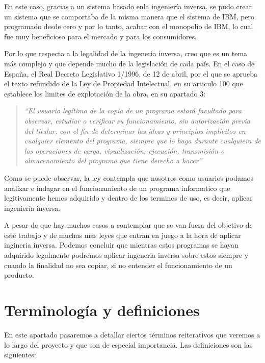 En este caso, gracias a un sistema basado enla ingeniería inversa, se pudo crear un sistema que se comportaba
de la misma manera que el sistema de IBM, pero programado desde cero y por lo tanto, acabar con el monopolio 
de IBM, lo cual fue muy beneficioso para el mercado y para los consumidores.

Por lo que respecta a la legalidad de la ingeneria inversa, creo que es un tema más complejo y que depende
mucho de la legislación de cada país. En el caso de España, el Real Decreto Legislativo 1/1996, de 12 de abril,
por el que se aprueba el texto refundido de la Ley de Propiedad Intelectual, en su articulo 100 que establece
los limites de explotación de la obra, en su apartado 3\cite{LeyPropiedadIntelectual}: 

\begin{quote}
    \textit{``El usuario legítimo de la copia de un programa estará facultado para observar, estudiar o 
    verificar su funcionamiento, sin autorización previa del titular, con el fin de determinar las ideas
    y principios implícitos en cualquier elemento del programa, siempre que lo haga durante cualquiera de
    las operaciones de carga, visualización, ejecución, transmisión o almacenamiento del programa que tiene
    derecho a hacer''}
\end{quote}

Como se puede observar, la ley contempla que nosotros como usuarios podamos analizar e indagar en el funcionamiento
de un programa informatico que legitivamente hemos adquirido y dentro de los terminos de uso, es decir, aplicar 
ingeniería inversa.

A pesar de que hay muchos casos a contemplar que se van fuera del objetivo de este trabajo y de muchas mas leyes
que entran en juego a la hora de aplicar ingineria inversa. Podemos concluir que mientras estos programas se hayan
adquirido legalmente podremos aplicar ingeneria inversa sobre estos siempre y cuando la finalidad no sea copiar, si
no entender el funcionamiento de un producto.

\section{Terminología y definiciones}
\label{sec:terminalogia}


En este apartado pasaremos a detallar ciertos términos reiterativos que veremos a lo
largo del proyecto y que son de especial importancia. Las definiciones son las siguientes:

